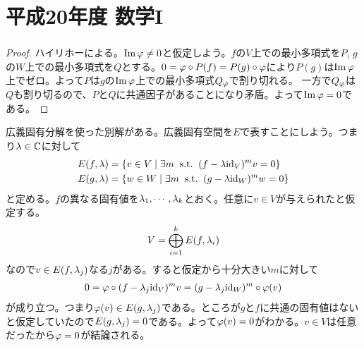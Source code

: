 \section{平成20年度 数学I}

\subsubsection{}%
\begin{proof}
  ハイリホーによる。$\operatorname{Im} {\varphi} \neq 0$と仮定しよう。$f$の$V$上での最小多項式を$P$, $g$の$W$上での最小多項式を$Q$とする。$0 = {\varphi} \circ P(f) = P(g) \circ {\varphi}$により$P(g)$は$\operatorname{Im} {\varphi}$上でゼロ。よって$P$は$g$の$\operatorname{Im} {\varphi}$上での最小多項式$Q_{{\varphi}}$で割り切れる。
  一方で$Q_{{\varphi}}$は$Q$も割り切るので、$P$と$Q$に共通因子があることになり矛盾。よって$\operatorname{Im} {\varphi}=0$である。
\end{proof}

\begin{com}
  広義固有分解を使った別解がある。広義固有空間を$E$で表すことにしよう。つまり${\lambda} \in {\mathbb C}$に対して
  \begin{align*}
    E(f,{\lambda}) & = \left\{  v \in V \mathrel{} \middle| \mathrel{} \exists m \; \; \text{s.t.} \; \; (f - {\lambda} \mathrm{id}_V)^m v = 0  \right\} \\
    E(g,{\lambda}) & = \left\{  w \in W \mathrel{} \middle| \mathrel{} \exists m \; \; \text{s.t.} \; \; (g - {\lambda} \mathrm{id}_W)^m w = 0  \right\}
  \end{align*}
  と定める。$f$の異なる固有値を${\lambda}_1, \cdots , {\lambda}_k$とおく。任意に$v \in V$が与えられたと仮定する。
  \[
  V = \bigoplus_{i=1}^k E(f, {\lambda}_i)
  \]
  なので$v \in E(f, {\lambda}_j)$なる$j$がある。すると仮定から十分大きい$m$に対して
  \begin{align*}
    0 = {\varphi} \circ (f - {\lambda}_j \mathrm{id}_V)^m v = (g - {\lambda}_j \mathrm{id}_W)^m \circ {\varphi} (v)
  \end{align*}
  が成り立つ。つまり${\varphi}(v) \in E(g, {\lambda}_j)$である。ところが$g$と$f$に共通の固有値はないと仮定していたので$E(g, {\lambda}_j)= 0$である。よって${\varphi}(v)=0$がわかる。$v \in V$は任意だったから${\varphi} = 0$が結論される。
\end{com}

\newpage

